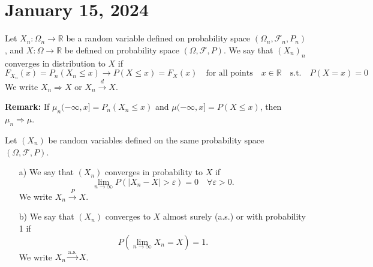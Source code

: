 \newpage
\section{January 15, 2024}

\begin{definition}
Let \( X_n: \Omega_n \rightarrow \mathbb{R} \) be a random variable defined on probability space \( (\Omega_n, \mathcal{F}_n, P_n) \), and \( X: \Omega \rightarrow \mathbb{R} \) be defined on probability space \( (\Omega, \mathcal{F}, P) \). We say that \( (X_n)_n \) converges in distribution to \( X \) if
\[
F_{X_n}(x) = P_n(X_n \leq x) \rightarrow P(X \leq x) = F_X(x) \quad \text{for all points} \quad x \in \mathbb{R} \quad \text{s.t.} \quad P(X = x) = 0
\]
We write \( X_n \Rightarrow X \) or \( X_n \xrightarrow{d} X \).

\textbf{Remark:} If \( \mu_n(-\infty, x] = P_n(X_n \leq x) \) and \( \mu(-\infty, x] = P(X \leq x) \), then \( \mu_n \Rightarrow \mu \).
\end{definition}

\begin{definition}
Let \( (X_n) \) be random variables defined on the same probability space \( (\Omega, \mathcal{F}, P) \). 
\begin{enumerate}
    \item[a)] We say that \( (X_n) \) converges in probability to \( X \) if
    \[ \lim_{n \to \infty} P(\lvert X_n - X \rvert > \varepsilon) = 0 \quad \forall \varepsilon > 0. \]
    We write \( X_n \xrightarrow{P} X \).
    
    \item[b)] We say that \( (X_n) \) converges to \( X \) almost surely (a.s.) or with probability 1 if
    \[ P(\lim_{n \to \infty} X_n = X) = 1. \]
    We write \( X_n \xrightarrow{\text{a.s.}} X \).
\end{enumerate}
\end{definition}


